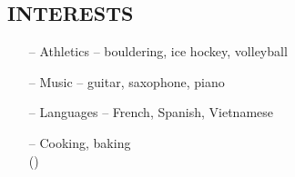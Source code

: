 \documentclass{aanguyen_res}
\begin{document}
\begin{sidebar}
    \section{INTERESTS}
      \begin{itemize}[leftmargin=0.45cm, noitemsep, topsep=0.0cm]%
        \item[--] Athletics -- bouldering, ice hockey, volleyball
        \item[--] Music -- guitar, saxophone, piano
        \item[--] Languages -- French, Spanish, Vietnamese
        \item[--] Cooking, baking \\ ()
      \end{itemize}%
  \end{sidebar}
\end{document}
